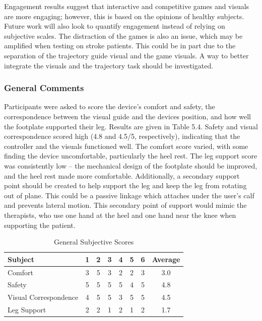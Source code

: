 \documentclass[12pt]{report}
\begin{document}
	Engagement results suggest that interactive and competitive games and visuals are more engaging; however, this is based on the opinions of healthy subjects. Future work will also look to quantify engagement instead of relying on subjective scales. The distraction of the games is also an issue, which may be amplified when testing on stroke patients. This could be in part due to the separation of the trajectory guide visual and the game visuals. A way to better integrate the visuals and the trajectory task should be investigated. 
	
	
\subsubsection{General Comments} \label{sec:general}
	
	Participants were asked to score the device's comfort and safety, the correspondence between the visual guide and the devices position, and how well the footplate supported their leg. Results are given in Table 5.4. Safety and visual correspondence scored high (4.8 and 4.5/5, respectively), indicating that the controller and the visuals functioned well. The comfort score varied, with some finding the device uncomfortable, particularly the heel rest. The leg support score was consistently low -- the mechanical design of the footplate should be improved, and the heel rest made more comfortable. Additionally, a secondary support point should be created to help support the leg and keep the leg from rotating out of plane. This could be a passive linkage which attaches under the user's calf and prevents lateral motion. This secondary point of support would mimic the therapists, who use one hand at the heel and one hand near the knee when supporting the patient. 
	
	\begin{table}[h] \label{tab:general}
	\centering \doublespacing
	\caption{General Subjective Scores}
	\begin{tabular}{l c c c c c c c }
	\toprule
	Subject & 1 & 2 & 3 & 4 & 5 & 6 & Average \\
	\midrule
	\rowcolor{gray!10} Comfort & 3 & 5 & 3 & 2 & 2 & 3 & 3.0 \\
	Safety & 5 & 5 & 5 & 5 & 4 & 5 & 4.8 \\
	\rowcolor{gray!10} Visual Correspondence & 4 & 5 & 5 & 3 & 5 & 5 & 4.5 \\
	Leg Support & 2 & 2 & 1 & 2 & 1 & 2 & 1.7 \\
	\bottomrule
	\end{tabular}
	\end{table}
	
\end{document}
